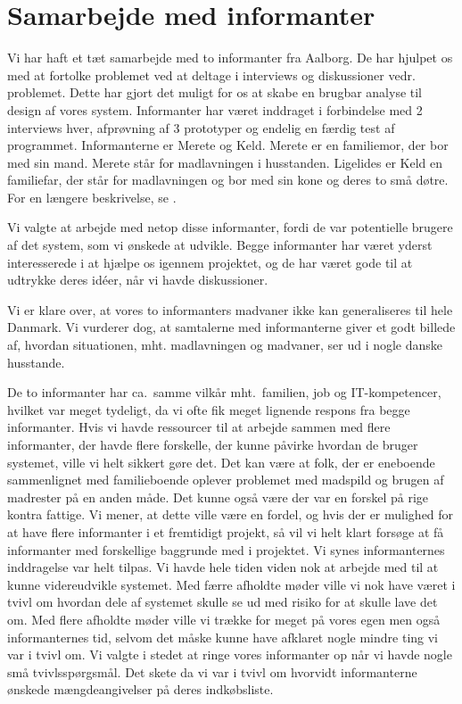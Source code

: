 \chapter{Samarbejde med informanter}
\label{akademiskinformanter}

Vi har haft et tæt samarbejde med to informanter fra Aalborg. De har hjulpet os med at fortolke problemet ved at deltage i interviews og diskussioner vedr. problemet. Dette har gjort det muligt for os at skabe en brugbar analyse til design af vores system. Informanter har været inddraget i forbindelse med 2 interviews hver, afprøvning af 3 prototyper og endelig en færdig test af programmet. Informanterne er Merete og Keld. Merete er en familiemor, der bor med sin mand. Merete står for madlavningen i husstanden. Ligelides er Keld en familiefar, der står for madlavningen og bor med sin kone og deres to små døtre. For en længere beskrivelse, se .

Vi valgte at arbejde med netop disse informanter, fordi de var potentielle brugere af det system, som vi ønskede at udvikle. Begge informanter har været yderst interesserede i at hjælpe os igennem projektet, og de har været gode til at udtrykke deres idéer, når vi havde diskussioner.

Vi er klare over, at vores to informanters madvaner ikke kan generaliseres til hele Danmark. Vi vurderer dog, at samtalerne med informanterne giver et godt billede af, hvordan situationen, mht. madlavningen og madvaner, ser ud i nogle danske husstande. 

De to informanter har ca.\ samme vilkår mht.\ familien, job og IT-kompetencer, hvilket var meget tydeligt, da vi ofte fik meget lignende respons fra begge informanter. Hvis vi havde ressourcer til at arbejde sammen med flere informanter, der havde flere forskelle, der kunne påvirke hvordan de bruger systemet, ville vi helt sikkert gøre det. Det kan være at folk, der er eneboende sammenlignet med familieboende oplever problemet med madspild og brugen af madrester på en anden måde. Det kunne også være der var en forskel på rige kontra fattige. Vi mener, at dette ville være en fordel, og hvis der er mulighed for at have flere informanter i et fremtidigt projekt, så vil vi helt klart forsøge at få informanter med forskellige baggrunde med i projektet.  Vi synes informanternes inddragelse var helt tilpas. Vi havde hele tiden viden nok at arbejde med til at kunne videreudvikle systemet. Med færre afholdte møder ville vi nok have været i tvivl om hvordan dele af systemet skulle se ud med risiko for at skulle lave det om. Med flere afholdte møder ville vi trække for meget på vores egen men også informanternes tid, selvom det måske kunne have afklaret nogle mindre ting vi var i tvivl om. Vi valgte i stedet at ringe vores informanter op når vi havde nogle små tvivlsspørgsmål. Det skete \fx da vi var i tvivl om hvorvidt informanterne ønskede mængdeangivelser på deres indkøbsliste.

